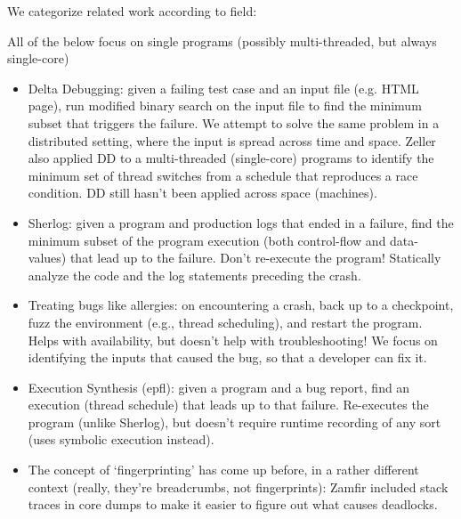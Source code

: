 We categorize related work according to field:

All of the below focus on single programs (possibly multi-threaded, but always single-core)
\begin{itemize}
\item Delta Debugging: given a failing test case and an input file (e.g. HTML page), run modified binary search on the input file to find the minimum subset that triggers the failure. We attempt to solve the same problem in a distributed setting, where the input is spread across time and space. Zeller also applied DD to a multi-threaded (single-core) programs to identify the minimum set of thread switches from a schedule that reproduces a race condition. DD still hasn't been applied across space (machines).
\item Sherlog: given a program and production logs that ended in a failure, find the minimum subset of the program execution (both control-flow and data-values) that lead up to the failure. Don't re-execute the program! Statically analyze the code and the log statements preceding the crash.
\item Treating bugs like allergies: on encountering a crash, back up to a checkpoint, fuzz the environment (e.g., thread scheduling), and restart the program. Helps with availability, but doesn't help with troubleshooting! We focus on identifying the inputs that caused the bug, so that a developer can fix it.
\item Execution Synthesis (epfl): given a program and a bug report, find an
execution (thread schedule) that leads up to that failure. Re-executes the
program (unlike Sherlog), but doesn't require runtime recording of any sort
(uses symbolic execution instead).
\item The concept of `fingerprinting' has come up before, in a rather different context (really, they're breadcrumbs, not fingerprints): Zamfir included stack traces in core dumps to make it easier to figure out what causes deadlocks.
\end{itemize}

